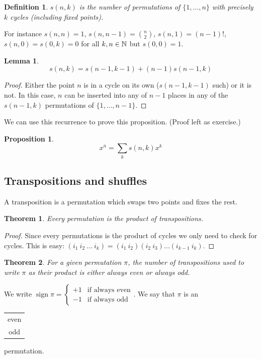 \documentclass{notes}
\theoremstyle{plain}
\newtheorem{theorem}{Theorem}[chapter]
\newtheorem*{definition}{Definition}
\newtheorem{lemma}{Lemma}[chapter]
\newtheorem*{proposition}{Proposition}
\DeclareMathOperator{\sign}{sign}
\begin{document}
\begin{definition}
$s(n,k)$ is the number of permutations of $\{1,\dots,n\}$ with precisely
$k$ cycles (including fixed points).
\end{definition}

For instance $s(n,n) = 1$, $s(n,n-1) = \binom{n}{2}$, $s(n,1) = (n-1)!$,
$s(n,0) = s(0,k) = 0$ for all $k,n \in \mathbb{N}$ but $s(0,0) = 1$.

\begin{lemma}
\[
s(n,k) = s(n-1,k-1) + (n-1) s(n-1,k)
\]
\end{lemma}

\begin{proof}
Either the point $n$ is in a cycle on its own ($s(n-1,k-1)$ such) or it
is not.  In this case, $n$ can be inserted into any of $n-1$ places in
any of the $s(n-1,k)$ permutations of $\{1,\dots,n-1 \}$.
\end{proof}

We can use this recurrence to prove this proposition. (Proof left as exercise.)

\begin{proposition}
\[
x^{\overline{n}} = \sum_k s(n,k) x^k
\]
\end{proposition}

\subsection{Transpositions and shuffles}

A transposition is a permutation which swaps two points and fixes the rest.

\begin{theorem}
Every permutation is the product of transpositions.
\end{theorem}

\begin{proof}
Since every permutations is the product of cycles we only need to check
for cycles.  This is easy: $(i_1\ i_2\ \dots\ i_k) = (i_1\ i_2)
(i_2\ i_3) \dots (i_{k-1}\ i_k)$.
\end{proof}

\begin{theorem}\label{T:permsign}
For a given permutation $\pi$, the number of transpositions used to
write $\pi$ as their product is either always even or always odd.
\end{theorem}

We write $\sign \pi = \begin{cases}
+1 & \text{if always even}\\
-1 & \text{if always odd}
\end{cases}$.  We say that $\pi$ is an \begin{tabular}{c} even \\ odd
\end{tabular} permutation.
\end{document}
